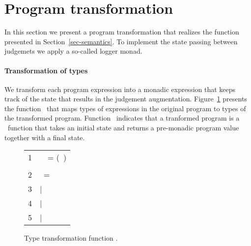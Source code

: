 \section{Program transformation}
\label{sec-transformation}

In this section we present a program transformation that realizes the
function \monitor presented in Section~\ref{sec-semantics}.
To implement the state passing between judgemets we apply a so-called
logger monad.



\paragraph{\bf Transformation of types}

We transform each program expression into a monadic expression that
keeps track of the state that results in the judgement augmentation.
Figure~\ref{fig-types-prods} presents the function \monadic\ that maps
types of expressions in the original program to types of the
transformed program.
Function \monadic\ indicates that a tranformed program is a \miniocaml\
function that takes an initial state and returns a \mbox{pre-monadic}
program value together with a final state.

\begin{figure}[t]
  \linespread{1}
  \begin{minipage}[t]{\columnwidth}
    \small
    \begin{tabular}{l@{\ }l}
      1 & \algLet \algRec \monadic\ \type\ = (\premonadic\ \type) \moncstr \\[\jot]
      & \\[\jot]
      2 & \algAnd \premonadic\ = \algFunction \\[\jot]
      3 & \tabT $|$ \ttt{\type[1] -> \type[2]}\
      \algArrow \ttt{$(\premonadic\ \type[1])$ -> $(\premonadic\
        \type[2])$ m} \\[\jot]
      4 & \tabT $|$ \ttt{(\type[1],\ \ldots,\ \type[n])\ \tycstr}\ 
      \algArrow \ttt{($(\premonadic\ \type[1])$,\ \ldots,\ $(\premonadic\
      \type[n])$)\ \tycstr} \\[\jot]
      5 & \tabT $|$ \type\ \algArrow \type
    \end{tabular}
  \end{minipage}
  \caption{Type transformation function \monadic.}
  \label{fig-types-prods}
\end{figure}


